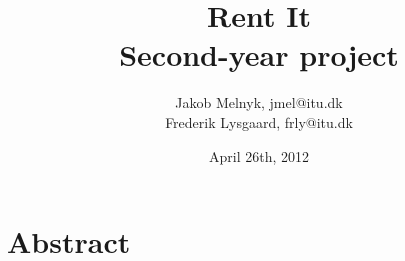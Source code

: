 \documentclass[12pt,a4paper,notitlepage]{article}
\title{\huge{Rent It}\\
\large{Second-year project}
}
\author{
Jakob Melnyk, jmel@itu.dk\\
Frederik Lysgaard, frly@itu.dk\\
}
\date{April 26th, 2012}
\begin{document}
\maketitle
\vfill
\section*{Abstract}

\clearpage
\tableofcontents
\pagebreak
\end{document}
